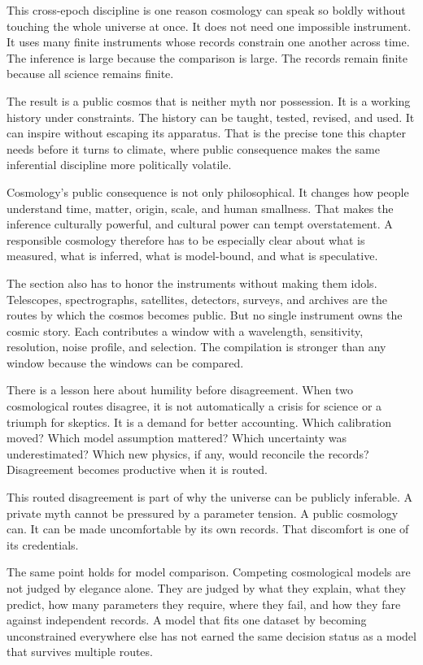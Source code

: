 This cross-epoch discipline is one reason cosmology can speak so boldly
without touching the whole universe at once. It does not need one impossible
instrument. It uses many finite instruments whose records constrain one
another across time. The inference is large because the comparison is large.
The records remain finite because all science remains finite.

The result is a public cosmos that is neither myth nor possession. It is a
working history under constraints. The history can be taught, tested, revised,
and used. It can inspire without escaping its apparatus. That is the precise
tone this chapter needs before it turns to climate, where public consequence
makes the same inferential discipline more politically volatile.

Cosmology's public consequence is not only philosophical. It changes how
people understand time, matter, origin, scale, and human smallness. That makes
the inference culturally powerful, and cultural power can tempt overstatement.
A responsible cosmology therefore has to be especially clear about what is
measured, what is inferred, what is model-bound, and what is speculative.

The section also has to honor the instruments without making them idols.
Telescopes, spectrographs, satellites, detectors, surveys, and archives are
the routes by which the cosmos becomes public. But no single instrument owns
the cosmic story. Each contributes a window with a wavelength, sensitivity,
resolution, noise profile, and selection. The compilation is stronger than
any window because the windows can be compared.

There is a lesson here about humility before disagreement. When two
cosmological routes disagree, it is not automatically a crisis for science or
a triumph for skeptics. It is a demand for better accounting. Which
calibration moved? Which model assumption mattered? Which uncertainty was
underestimated? Which new physics, if any, would reconcile the records?
Disagreement becomes productive when it is routed.

This routed disagreement is part of why the universe can be publicly
inferable. A private myth cannot be pressured by a parameter tension. A public
cosmology can. It can be made uncomfortable by its own records. That
discomfort is one of its credentials.

The same point holds for model comparison. Competing cosmological models are
not judged by elegance alone. They are judged by what they explain, what they
predict, how many parameters they require, where they fail, and how they fare
against independent records. A model that fits one dataset by becoming
unconstrained everywhere else has not earned the same decision status as a
model that survives multiple routes.

